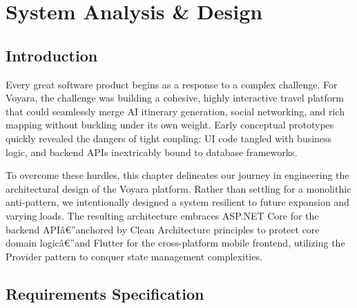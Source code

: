 \chapter{System Analysis \& Design}

\section{Introduction}
Every great software product begins as a response to a complex challenge. For Voyara, the challenge was building a cohesive, highly interactive travel platform that could seamlessly merge AI itinerary generation, social networking, and rich mapping without buckling under its own weight. Early conceptual prototypes quickly revealed the dangers of tight coupling: UI code tangled with business logic, and backend APIs inextricably bound to database frameworks. 

To overcome these hurdles, this chapter delineates our journey in engineering the architectural design of the Voyara platform. Rather than settling for a monolithic anti-pattern, we intentionally designed a system resilient to future expansion and varying loads. The resulting architecture embraces ASP.NET Core \cite{aspnetcore} for the backend APIâ€”anchored by Clean Architecture \cite{cleanarchitecture} principles to protect core domain logicâ€”and Flutter \cite{flutter} for the cross-platform mobile frontend, utilizing the Provider pattern \cite{providerpattern} to conquer state management complexities.

\section{Requirements Specification}

